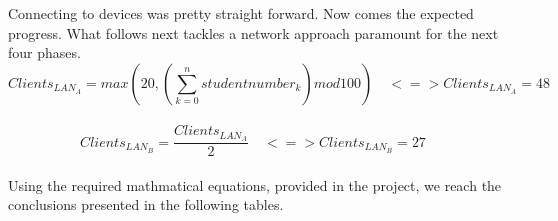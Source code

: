 \documentclass[11pt,a4paper]{report}
\begin{document}
        Connecting to devices was pretty straight forward. Now comes the expected progress. What follows next tackles a network approach paramount for the next four phases.\\
            \[
                Clients_{LAN_A} = max\left(20, \left(\sum_{k=0}^n studentnumber_k\right)mod 100\right)\quad <=> 
                Clients_{LAN_A} = 48\quad
            \] \\
            \[
                Clients_{LAN_B} = \frac{Clients_{LAN_A}}{2}\quad <=>
                Clients_{LAN_B} = 27\quad
            \]\\

        Using the required mathmatical equations, provided in the project, we reach the conclusions presented in the following tables.\\
\end{document}
